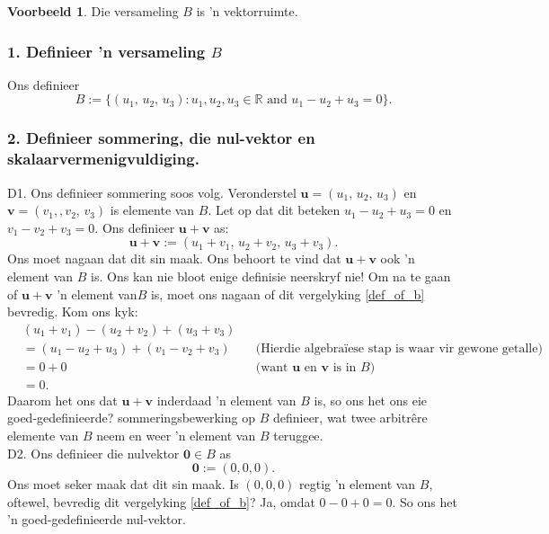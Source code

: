 \documentclass[a4paper,11pt]{book}
\theoremstyle{definition}
\newtheorem{example_environment}{Voorbeeld}[chapter]
\newcommand{\be}{\begin{equation}}
\newcommand{\ee}{\end{equation}}
\newcommand{\ve}[1]{\mathbf{#1}}
\newenvironment{example}
	{
		\begin{oframed}
		\begin{example_environment}
	}
	{
		\end{example_environment}
		\end{oframed}
	}
\begin{document}
\begin{example} Die versameling $B$ is 'n vektorruimte.
	\subsubsection{1. Definieer 'n versameling $B$}
	Ons definieer
	\be \label{def_of_b}
	B := \{ (u_1, \, u_2, \, u_3) : u_1, u_2, u_3 \in \mathbb{R} \mbox{ and
	} u_1 - u_2 + u_3 = 0\} .
	\ee

	\subsubsection{2. Definieer sommering, die nul-vektor en
	skalaarvermenigvuldiging.}
	D1. Ons definieer sommering soos volg. Veronderstel $\ve{u} = (u_1, \,
	u_2, \, u_3)$ en $\ve{v} = (v_1, , v_2, \, v_3)$ is elemente van $B$.
	Let op dat dit beteken $u_1 - u_2 + u_3 = 0$ en $v_1 - v_2 + v_3 = 0$.
	Ons definieer $\ve{u} + \ve{v}$ as:
	\be \label{def_add_in_B}
	\ve{u} + \ve{v} := (u_1 + v_1, \, u_2 + v_2, \, u_3 + v_3).
	\ee
	Ons moet nagaan dat dit sin maak. Ons behoort te vind dat $\ve{u} +
	\ve{v}$ ook 'n element van $B$ is. Ons kan nie bloot enige definisie
	neerskryf nie! Om na te gaan of $\ve{u} + \ve{v}$ 'n element van$B$ is,
	moet ons nagaan of dit vergelyking \eqref{def_of_b} bevredig. Kom ons
	kyk:
	\begin{align*}
		&(u_1 + v_1) - (u_2 + v_2) + (u_3 + v_3) \\
		&= (u_1 - u_2 + u_3) + (v_1 - v_2 + v_3) && \mbox{(Hierdie
		algebra{\"i}ese
		stap is waar vir gewone getalle)} \\
		&= 0 + 0 && \mbox{(want $\ve{u}$ en $\ve{v}$ is in $B$)} \\
		&= 0.
	\end{align*}
	Daarom het ons dat $\ve{u} + \ve{v}$ inderdaad 'n element van $B$ is,
	so ons het ons eie goed-gedefinieerde? sommeringsbewerking op $B$
	definieer, wat twee arbitr{\^e}re elemente van $B$ neem en weer 'n
	element van $B$ teruggee. \\

	\noindent D2. Ons definieer die nulvektor $\ve{0} \in B$ as
	\be \label{zero_vec_in_B}
	\ve{0} := (0, 0, 0).
	\ee
	Ons moet seker maak dat dit sin maak. Is $(0,0,0)$ regtig 'n element
	van $B$, oftewel, bevredig dit vergelyking \eqref{def_of_b}? Ja, omdat
	$0 - 0 + 0 = 0$. So ons het 'n goed-gedefinieerde nul-vektor. \\


\end{example}
\end{document}
